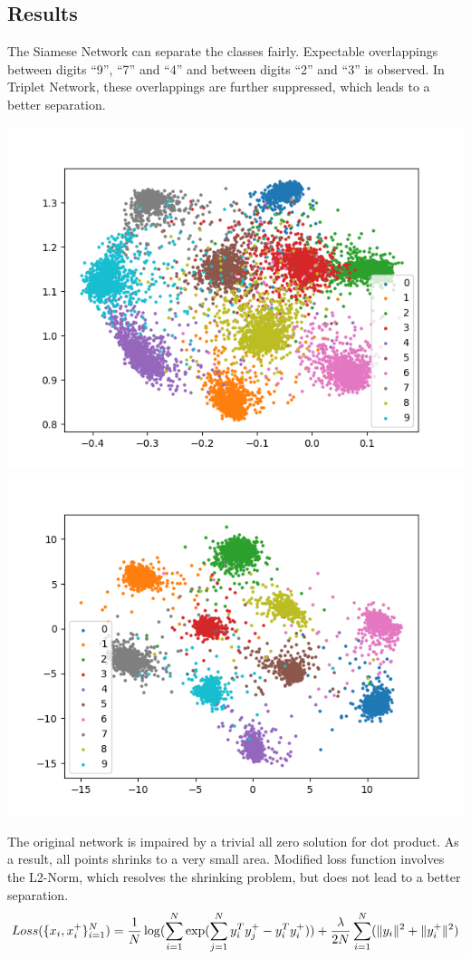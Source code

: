 \documentclass[a0,portrait]{a0poster}
\begin{document}
\begin{multicols}{2}
		\section*{Results}
		The Siamese Network can separate the classes fairly. Expectable overlappings between digits ``9'', ``7'' and ``4'' and between digits ``2'' and ``3'' is observed. In Triplet Network, these overlappings are further suppressed, which leads to a better separation.
		\begin{center}\vspace{1cm}
			\includegraphics[width=0.45\linewidth]{../report_shaoheng/siamese}
			\includegraphics[width=0.45\linewidth]{../report_shaoheng/triplet}
		\end{center}\vspace{1cm}
		
		The original network is impaired by a trivial all zero solution for dot product. As a result, all points shrinks to a very small area. Modified loss function involves the L2-Norm, which resolves the shrinking problem, but does not lead to a better separation.
		\begin{equation}
		Loss(\{x_i,x_i^+\}^N_{i=1})\notag
		=\frac{1}{N}\log(\sum_{i=1}^N\exp(\sum_{j=1}^Ny^T_iy_j^+-y_i^Ty_i^+))+ \frac{\lambda}{2N} \sum_{i=1}^N(\lVert y_i\rVert^2+ \lVert y^+_i\rVert^2)
		\end{equation}
		

\end{multicols}
\end{document}
